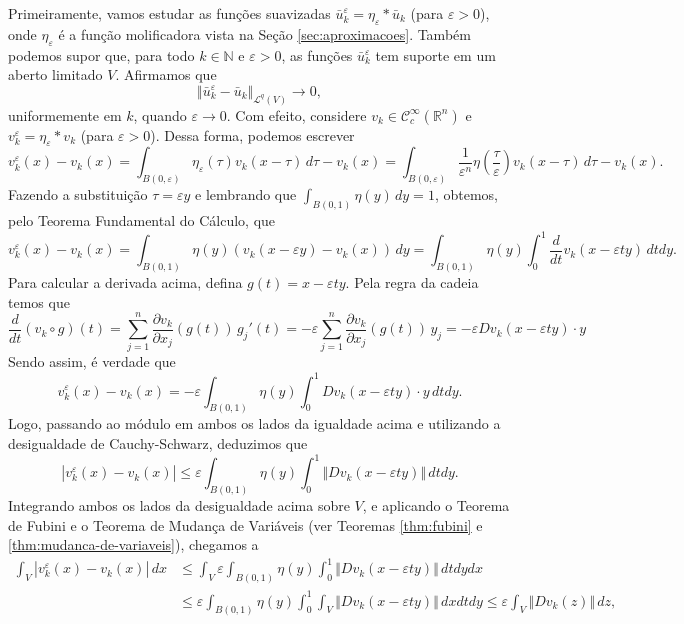 \documentclass[a4paper, 11pt]{book}
\theoremstyle{definition}
\newcommand{\bN}{\mathbb{N}}
\newcommand{\bR}{\mathbb{R}}
\newcommand{\cC}{\mathcal{C}}
\newcommand{\cL}{\mathcal{L}}
\begin{document}
\begin{prf}
    Primeiramente, vamos estudar as funções suavizadas $\bar u_k^\varepsilon = \eta_\varepsilon * \bar u_k$ (para $\varepsilon > 0$), onde $\eta_\varepsilon$ é a função molificadora vista na Seção \ref{sec:aproximacoes}.
    Também podemos supor que, para todo $k \in \bN$ e $\varepsilon > 0$, as funções $\bar u_k^\varepsilon$ tem suporte em um aberto limitado $V$.
    Afirmamos que
    \[
        \Vert \bar u_k^\varepsilon - \bar u_k \Vert_{\cL^q(V)} \to 0,
    \]
    uniformemente em $k$, quando $\varepsilon \to 0$.
    Com efeito, considere $v_k \in \cC^{\infty}_c(\bR^n)$ e $v_k^\varepsilon = \eta_\varepsilon * v_k$ (para $\varepsilon > 0$).
    Dessa forma, podemos escrever
    \[
        v_k^\varepsilon(x) - v_k(x) = \int_{B(0,\varepsilon)} \eta_\varepsilon(\tau) v_k (x - \tau) \,d\tau - v_k(x)  = \int_{B(0,\varepsilon)} \frac{1}{\varepsilon^n} \eta \left( \frac{\tau}{\varepsilon} \right) v_k (x - \tau) \,d\tau - v_k(x).
    \]
    Fazendo a substituição $\tau = \varepsilon y$ e lembrando que $\int_{B(0,1)} \eta(y) \,dy = 1$, obtemos, pelo Teorema Fundamental do Cálculo, que
    \[
        v_k^\varepsilon(x) - v_k(x) = \int_{B(0,1)} \eta(y) \left( v_k(x - \varepsilon y) - v_k(x) \right) \,dy = \int_{B(0,1)} \eta(y) \int_0^1 \frac{d}{dt}v_k(x - \varepsilon t y) \,dt dy.
    \]
    Para calcular a derivada acima, defina $g(t) = x - \varepsilon t y$. Pela regra da cadeia temos que
    \[
        \frac{d}{dt} (v_k \circ g)(t) = \sum_{j=1}^n \dfrac{\partial v_k}{\partial x_j} (g(t)) \, g_j'(t) = -\varepsilon\sum_{j=1}^{n} \dfrac{\partial v_k}{\partial x_j}(g(t)) \,y_j = -\varepsilon Dv_k(x - \varepsilon ty) \cdot y
    \]
    Sendo assim, é verdade que
    \[
        v_k^\varepsilon(x) - v_k(x) = -\varepsilon \int_{B(0,1)} \eta(y) \int_0^1 Dv_k(x - \varepsilon ty) \cdot y \,dtdy.
    \]
    Logo, passando ao módulo em ambos os lados da igualdade acima e utilizando a desigualdade de Cauchy-Schwarz, deduzimos que
    \[
        |v_k^\varepsilon(x) - v_k(x)| \leqslant \varepsilon \int_{B(0,1)} \eta(y) \int_0^1 \Vert Dv_k(x - \varepsilon ty) \Vert \,dtdy.
    \]
    Integrando ambos os lados da desigualdade acima sobre $V$, e aplicando o Teorema de Fubini e o Teorema de Mudança de Variáveis (ver Teoremas \ref{thm:fubini} e \ref{thm:mudanca-de-variaveis}), chegamos a
    \[
        \begin{aligned}
            \int_{V} |v_k^\varepsilon(x) - v_k(x)|\,dx &\leqslant \int_{V} \varepsilon \int_{B(0,1)} \eta(y) \int_0^1 \Vert Dv_k(x - \varepsilon ty) \Vert \,dtdydx\\
            &\leqslant \varepsilon \int_{B(0,1)} \eta(y) \int_0^1 \int_{V} \Vert Dv_k(x - \varepsilon ty) \Vert \,dxdtdy \leqslant \varepsilon \int_{V} \Vert Dv_k(z) \Vert    \,dz,

\end{aligned}\]
\end{prf}
\end{document}

